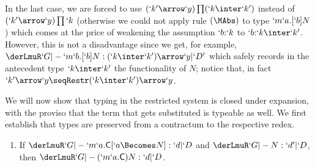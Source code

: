 \documentclass{lmcs}
\begin{document}
In the last case, we are forced to use $(`k'\arrow `y)\prod (`k\inter`k')$ instead of $(`k'\arrow `y)\prod `k$ (otherwise we could not apply rule $(\MAbs)$ to type $ `m`a.[`b]N$) which comes at the price of weakening the assumption $`b{:}`k$ to $`b{:}`k\inter`k'$. 
However, this is not a disadvantage since we get, for example, $ \derLmuR `G |- `m`b.{[`b]}N : (`k\inter`k')\arrow `y | `D' $ which safely records in the antecedent type $`k\inter`k'$ the functionality of $N$; notice that, in fact $`k'\arrow `y \seqRestr (`k\inter`k')\arrow `y$.

We will now show that typing in the restricted system is closed under expansion, with the proviso that the term that gets substituted is typeable as well. 
We first establish that types are preserved from a contractum to the respective redex.

 \begin{lem} \label{lem:contractum-exp}

 \begin{enumerate}

\firstitem \label{lem:contractum-exp-beta}
If $ \derLmuR `G |- M[N/x] : `d | `D $ and $ \derLmuR `G |- N : `d' | `D $, then $ \derLmuR `G |- (`l x.M)N : `d | `D $.

\item \label{lem:contractum-exp-mu}
If $\derLmuR `G |- {`m `a.\Cmd[`a \Becomes N]} : `d | `D $ and $\derLmuR `G |- N : `d' | `D $, then $ \derLmuR `G |- {(`m `a.\Cmd)N} : `d | `D $.
 \end{enumerate}
 \end{lem}
\end{document}
